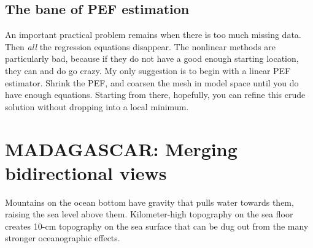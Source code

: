 \subsection{The bane of PEF estimation}
An important practical problem remains when there is too much missing data.
Then {\em all} the regression equations disappear.
The nonlinear methods are particularly bad,
because if they do not have a good enough starting location,
they can and do go crazy.
My only suggestion is to begin with a linear PEF estimator.
Shrink the PEF, and coarsen the mesh in model space
until you do have enough equations.
Starting from there, hopefully,
you can refine this crude solution
without dropping into a local minimum.
\par
{}
\par\noindent



\section{MADAGASCAR: Merging bidirectional views}
\par
Mountains on the ocean bottom have gravity that pulls water towards them,
raising the sea level above them.
Kilometer-high topography on the sea floor creates 10-cm topography on the sea surface
that can be dug out from the many stronger oceanographic effects.

